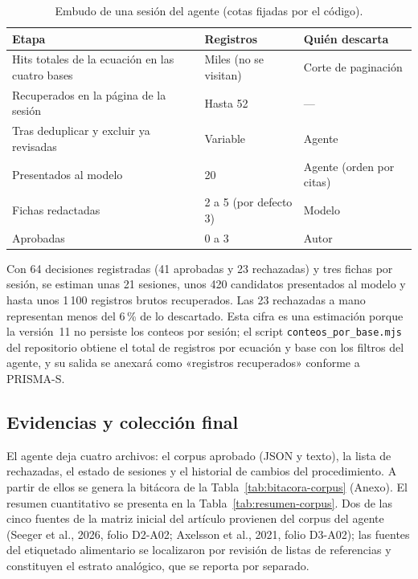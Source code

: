 \begin{table}[htbp]\centering\small
\caption{Embudo de una sesión del agente (cotas fijadas por el código).}
\label{tab:embudo}
\begin{tabular}{@{}p{7.2cm}p{3.4cm}p{3.0cm}@{}}
\toprule
Etapa & Registros & Quién descarta \\
\midrule
Hits totales de la ecuación en las cuatro bases & Miles (no se visitan) & Corte de paginación \\
Recuperados en la página de la sesión & Hasta 52 & --- \\
Tras deduplicar y excluir ya revisadas & Variable & Agente \\
Presentados al modelo & 20 & Agente (orden por citas) \\
Fichas redactadas & 2 a 5 (por defecto 3) & Modelo \\
Aprobadas & 0 a 3 & Autor \\
\bottomrule
\end{tabular}
\end{table}

Con 64 decisiones registradas (41 aprobadas y 23 rechazadas) y tres fichas
por sesión, se estiman unas 21 sesiones, unos 420 candidatos presentados al
modelo y hasta unos 1\,100 registros brutos recuperados. Las 23 rechazadas a
mano representan menos del 6\,\% de lo descartado. Esta cifra es una
estimación porque la versión~11 no persiste los conteos por sesión; el
script \texttt{conteos\_por\_base.mjs} del repositorio obtiene el total de
registros por ecuación y base con los filtros del agente, y su salida se
anexará como «registros recuperados» conforme a PRISMA-S.

\subsection{Evidencias y colección final}

El agente deja cuatro archivos: el corpus aprobado (JSON y texto), la lista
de rechazadas, el estado de sesiones y el historial de cambios del
procedimiento. A partir de ellos se genera la bitácora de la
Tabla~\ref{tab:bitacora-corpus} (Anexo). El resumen cuantitativo se presenta
en la Tabla~\ref{tab:resumen-corpus}. Dos de las cinco fuentes de la matriz
inicial del artículo provienen del corpus del agente (Seeger et al., 2026,
folio D2-A02; Axelsson et al., 2021, folio D3-A02); las fuentes del
etiquetado alimentario se localizaron por revisión de listas de referencias y
constituyen el estrato analógico, que se reporta por separado.

